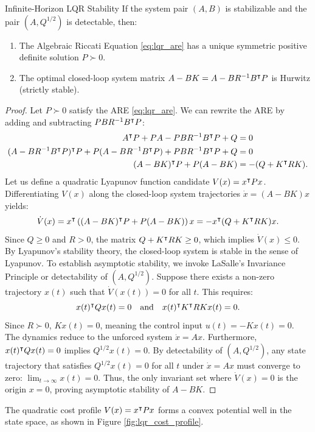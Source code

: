 \begin{mytheorem}{Infinite-Horizon LQR Stability}
If the system pair $(A, B)$ is stabilizable and the pair $(A, Q^{1/2})$ is detectable, then:
\begin{enumerate}
    \item The Algebraic Riccati Equation \eqref{eq:lqr_are} has a unique symmetric positive definite solution $P \succ 0$.
    \item The optimal closed-loop system matrix $A - B K = A - B R^{-1} B^\intercal P$ is Hurwitz (strictly stable).
\end{enumerate}
\end{mytheorem}

\begin{proof}
Let $P \succ 0$ satisfy the ARE \eqref{eq:lqr_are}. We can rewrite the ARE by adding and subtracting $P B R^{-1} B^\intercal P$:
\begin{align}
    A^\intercal P + P A - P B R^{-1} B^\intercal P + Q &= 0 \nonumber \\
    (A - B R^{-1} B^\intercal P)^\intercal P + P (A - B R^{-1} B^\intercal P) + P B R^{-1} B^\intercal P + Q &= 0 \nonumber \\
    (A - B K)^\intercal P + P (A - B K) &= -(Q + K^\intercal R K) . \label{eq:are_rewritten}
\end{align}
Let us define a quadratic Lyapunov function candidate $V(x) = x^\intercal P x$. Differentiating $V(x)$ along the closed-loop system trajectories $\dot{x} = (A - B K) x$ yields:
\begin{equation}
\dot{V}(x) = x^\intercal \left( (A - B K)^\intercal P + P (A - B K) \right) x = -x^\intercal (Q + K^\intercal R K) x .
\end{equation}
Since $Q \ge 0$ and $R > 0$, the matrix $Q + K^\intercal R K \ge 0$, which implies $\dot{V}(x) \le 0$. By Lyapunov's stability theory, the closed-loop system is stable in the sense of Lyapunov. To establish asymptotic stability, we invoke LaSalle's Invariance Principle or detectability of $(A, Q^{1/2})$.
Suppose there exists a non-zero trajectory $x(t)$ such that $\dot{V}(x(t)) = 0$ for all $t$. This requires:
\begin{equation}
x(t)^\intercal Q x(t) = 0 \quad \text{and} \quad x(t)^\intercal K^\intercal R K x(t) = 0 .
\end{equation}
Since $R \succ 0$, $K x(t) = 0$, meaning the control input $u(t) = -K x(t) = 0$. The dynamics reduce to the unforced system $\dot{x} = A x$. Furthermore, $x(t)^\intercal Q x(t) = 0$ implies $Q^{1/2} x(t) = 0$.
By detectability of $(A, Q^{1/2})$, any state trajectory that satisfies $Q^{1/2} x(t) = 0$ for all $t$ under $\dot{x} = Ax$ must converge to zero: $\lim_{t\to\infty} x(t) = 0$.
Thus, the only invariant set where $\dot{V}(x) = 0$ is the origin $x=0$, proving asymptotic stability of $A - BK$.
\end{proof}
The quadratic cost profile $V(x) = x^\intercal P x$ forms a convex potential well in the state space, as shown in Figure \ref{fig:lqr_cost_profile}.

